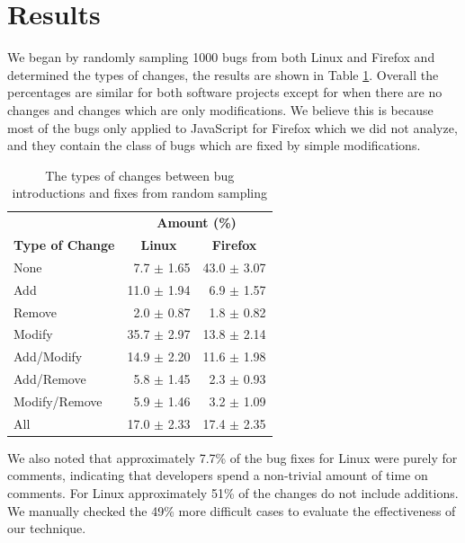 \section{Results}
\label{sec-results}

We began by randomly sampling 1000 bugs from both Linux and Firefox
and determined the types of changes, the results are shown in Table
\ref{tbl-changes}. Overall the percentages are similar for both
software projects except for when there are no changes and changes
which are only modifications. We believe this is because most of the
bugs only applied to JavaScript for Firefox which we did not analyze,
and they contain the class of bugs which are fixed by simple
modifications.

\begin{table}
\begin{center}
\begin{tabular}{l|r|r}
\multicolumn{1}{c}{} & \multicolumn{2}{c}{\textbf{Amount (\%)}} \\
\textbf{Type of Change} & \multicolumn{1}{c|}{\textbf{Linux}} & \multicolumn{1}{c}{\textbf{Firefox}}\\
\hline
None          &  7.7 $\pm$ 1.65 & 43.0 $\pm$ 3.07\\
\hline
Add           & 11.0 $\pm$ 1.94 & 6.9 $\pm$ 1.57\\
\hline
Remove        &  2.0 $\pm$ 0.87 & 1.8 $\pm$ 0.82\\
\hline
Modify        & 35.7 $\pm$ 2.97 & 13.8 $\pm$ 2.14\\
\hline
Add/Modify    & 14.9 $\pm$ 2.20 & 11.6 $\pm$ 1.98\\
\hline
Add/Remove    &  5.8 $\pm$ 1.45 & 2.3 $\pm$ 0.93\\
\hline
Modify/Remove &  5.9 $\pm$ 1.46 & 3.2 $\pm$ 1.09 \\
\hline
All           & 17.0 $\pm$ 2.33 & 17.4 $\pm$ 2.35\\
\end{tabular}
\end{center}
\caption{The types of changes between bug introductions and fixes from random sampling}
\label{tbl-changes}
\end{table}

We also noted that approximately 7.7\% of the bug fixes for Linux were
purely for comments, indicating that developers spend a non-trivial
amount of time on comments. For Linux approximately 51\% of the
changes do not include additions. We manually checked the 49\% more
difficult cases to evaluate the effectiveness of our technique.

